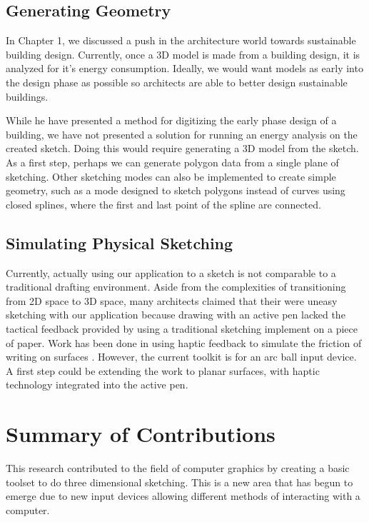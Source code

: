 \subsection{Generating Geometry}
In Chapter 1, we discussed a push in the architecture world towards sustainable building design.
Currently, once a 3D model is made from a building design, it is analyzed for it's energy consumption.
Ideally, we would want models as early into the design phase as possible so architects are able to better design sustainable buildings.

While he have presented a method for digitizing the early phase design of a building, we have not presented a solution for running an energy analysis on the created sketch.
Doing this would require generating a 3D model from the sketch.
As a first step, perhaps we can generate polygon data from a single plane of sketching.
Other sketching modes can also be implemented to create simple geometry, such as a mode designed to sketch polygons instead of curves using closed splines, where the first and last point of the spline are connected.

\subsection{Simulating Physical Sketching}

Currently, actually using our application to a sketch is not comparable to a traditional drafting environment.
Aside from the complexities of transitioning from 2D space to 3D space, many architects claimed that their were uneasy sketching with our application because drawing with an active pen lacked the tactical feedback provided by using a traditional sketching implement on a piece of paper.
Work has been done in using haptic feedback to simulate the friction of writing on surfaces \autocite{haptics}.
However, the current toolkit is for an arc ball input device.
A first step could be extending the work to planar surfaces, with haptic technology integrated into the active pen.

\section{Summary of Contributions}

This research contributed to the field of computer graphics by creating a basic toolset to do three dimensional sketching.
This is a new area that has begun to emerge due to new input devices allowing different methods of interacting with a computer.

